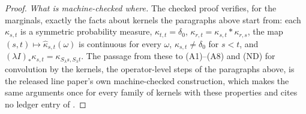 \begin{proof}
\emph{What is machine-checked where.} The checked proof verifies, for the marginals, exactly the
facts about kernels the paragraphs above start from: each $\kappa_{s,t}$ is a symmetric
probability measure, $\kappa_{t,t} = \delta_0$, $\kappa_{r,t} = \kappa_{s,t} * \kappa_{r,s}$, the map
$(s,t) \mapsto \widehat\kappa_{s,t}(\omega)$ is continuous for every $\omega$,
$\kappa_{s,t} \ne \delta_0$ for $s < t$, and $(\lambda I)_*\kappa_{s,t} =
\kappa_{S_\lambda s,S_\lambda t}$. The passage from these to (A1)--(A8) and (ND) for convolution
by the kernels, the operator-level steps of the paragraphs above, is the released line paper's own
machine-checked construction, which makes the same arguments once for every family of kernels with
these properties and cites no ledger entry of .
\end{proof}

